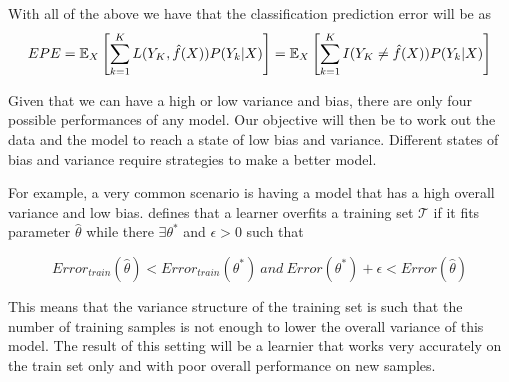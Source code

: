 
With all of the above we have that the classification prediction error will be as
\begin{equation}
EPE = \operatorname{\mathbb{E}}_X\left[ \sum_{k=1}^{K} L( Y_K , \hat{f}(X) ) P(Y_k|X) \right] =  
\operatorname{\mathbb{E}}_X\left[ \sum_{k=1}^{K} I(Y _K\neq \hat{f}(X)) P(Y_k|X) \right]
\end{equation}\label{eq:classificationEPE}



Given that we can have a high or low variance and bias, there are only four possible performances of any model. Our objective will then be to work out the data and the model to reach a state of low bias and variance. Different states of bias and variance require strategies to make a better model.

For example, a very common scenario is having a model that has a high overall variance and low bias. \textcite{dworkFeldman-adaptiveDataAnalysis2015} defines that a learner overfits a training set $\mathcal{T}$ if it fits parameter $\hat{\theta}$ while there $\exists \theta^*$ and $\epsilon > 0 $ such that

\begin{equation} 
Error_{train}(\hat{\theta}) < Error_{train}(\theta^*) \ and \ Error(\theta^*) + \epsilon < Error(\hat{\theta})
\end{equation}\label{eq:overfitting}


This means that the variance structure of the training set is such that the number of training samples is not enough to lower the overall variance of this model. The result of this setting will be a learnier that works very accurately on the train set only and with poor overall performance on new samples.



